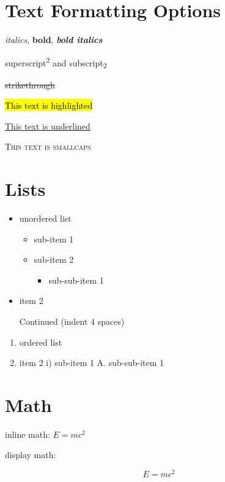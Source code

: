 \documentclass[
  11pt,
  letterpaper,
]{book}
\providecommand{\tightlist}{%
  \setlength{\itemsep}{0pt}\setlength{\parskip}{0pt}}
\begin{document}
\section{Text Formatting Options}\label{text-formatting-options-1}

\emph{italics}, \textbf{bold}, \emph{\textbf{bold italics}}

superscript\textsuperscript{2} and subscript\textsubscript{2}

\st{strikethrough}

\hl{This text is highlighted}

\ul{This text is underlined}

\textsc{This text is smallcaps}

\section{Lists}\label{lists-1}

\begin{itemize}
\item
  unordered list

  \begin{itemize}
  \tightlist
  \item
    sub-item 1
  \item
    sub-item 2

    \begin{itemize}
    \tightlist
    \item
      sub-sub-item 1
    \end{itemize}
  \end{itemize}
\item
  item 2

  Continued (indent 4 spaces)
\end{itemize}

\begin{enumerate}
\def\labelenumi{\arabic{enumi}.}
\tightlist
\item
  ordered list
\item
  item 2 i) sub-item 1 A. sub-sub-item 1
\end{enumerate}

\section{Math}\label{math-1}

inline math: \(E = mc^{2}\)

display math:

\[E = mc^{2}\]
\end{document}
